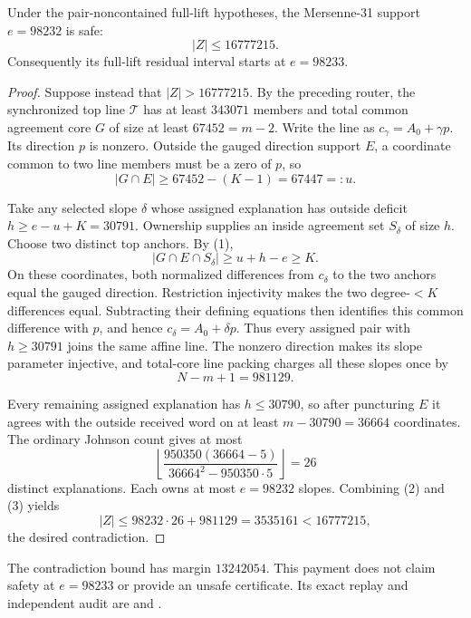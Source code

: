 \documentclass[11pt,a4paper]{amsart}
\numberwithin{equation}{section}
\theoremstyle{remark}
\begin{document}
\begin{corollary}
\label{cor:full-lift-residue-zero-core-absorption}
Under the pair-noncontained full-lift hypotheses, the Mersenne-31 support
$e=98232$ is safe:
\[
 |Z|\le16777215.
\]
Consequently its full-lift residual interval starts at $e=98233$.
\end{corollary}

\begin{proof}
Suppose instead that $|Z|>16777215$.  By the preceding router, the
synchronized top line $\mathcal T$ has at least $343071$ members and total
common agreement core $G$ of size at least $67452=m-2$.  Write the line as
$c_\gamma=A_0+\gamma p$.  Its direction $p$ is nonzero.  Outside the
gauged direction support $E$, a coordinate common to two line members must
be a zero of $p$, so
\[
 |G\cap E|\ge67452-(K-1)=67447=:u.                 \tag{1}
\]

Take any selected slope $\delta$ whose assigned explanation has outside
deficit $h\ge e-u+K=30791$.  Ownership supplies an inside agreement set
$S_\delta$ of size $h$.  Choose two distinct top anchors.  By (1),
\[
 |G\cap E\cap S_\delta|\ge u+h-e\ge K.
\]
On these coordinates, both normalized differences from $c_\delta$ to the
two anchors equal the gauged direction.  Restriction injectivity makes the
two degree-$<K$ differences equal.  Subtracting their defining equations
then identifies this common difference with $p$, and hence
$c_\delta=A_0+\delta p$.  Thus every assigned pair with $h\ge30791$ joins
the same affine line.  The nonzero direction makes its slope parameter
injective, and total-core line packing charges all these slopes once by
\[
 N-m+1=981129.                                      \tag{2}
\]

Every remaining assigned explanation has $h\le30790$, so after puncturing
$E$ it agrees with the outside received word on at least
$m-30790=36664$ coordinates.  The ordinary Johnson count gives at most
\[
 \left\lfloor
 \frac{950350(36664-5)}{36664^2-950350\cdot5}
 \right\rfloor=26                                  \tag{3}
\]
distinct explanations.  Each owns at most $e=98232$ slopes.  Combining
(2) and (3) yields
\[
 |Z|\le98232\cdot26+981129
     =3535161<16777215,
\]
the desired contradiction.
\end{proof}

\begin{remark}
The contradiction bound has margin $13242054$.  This payment does not
claim safety at $e=98233$ or provide an unsafe certificate.  Its exact
replay and independent audit are
and
.
\end{remark}
\end{document}
